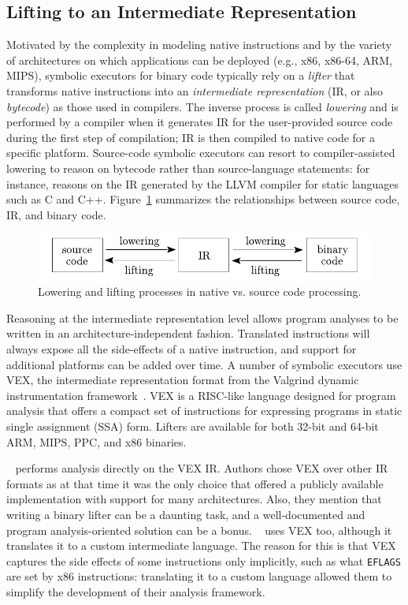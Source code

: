 \subsection{Lifting to an Intermediate Representation}
Motivated by the complexity in modeling native instructions and by the variety of architectures on which applications can be deployed (e.g., x86, x86-64, ARM, MIPS), symbolic executors for binary code typically rely on a {\em lifter} that transforms native instructions into an {\em intermediate representation} (IR, or also {\em bytecode}) as those used in compilers. The inverse process is called {\em lowering} and is performed by a compiler when it generates IR for the user-provided source code during the first step of compilation; IR is then compiled to native code for a specific platform. Source-code symbolic executors can resort to compiler-assisted lowering to reason on bytecode rather than source-language statements: for instance, \cite{KLEE-OSDI08} reasons on the IR generated by the LLVM compiler for static languages such as C and C++. Figure~\ref{fig:lowering} summarizes the relationships between source code, IR, and binary code.

\begin{figure}[t!]
  \centering
  \includegraphics[width=.6\columnwidth]{images/compiler}
  \caption{\label{fig:lowering} Lowering and lifting processes in native vs. source code processing.}
\end{figure}

Reasoning at the intermediate representation level allows program analyses to be written in an architecture-independent fashion. Translated instructions will always expose all the side-effects of a native instruction, and support for additional platforms can be added over time. A number of symbolic executors use VEX, the intermediate representation format from the Valgrind dynamic instrumentation framework~\cite{VALGRIND-PLDI07}. VEX is a RISC-like language designed for program analysis that offers a compact set of instructions for expressing programs in static single assignment (SSA) form. Lifters are available for both 32-bit and 64-bit ARM, MIPS, PPC, and x86 binaries.

~\cite{ANGR-SP16} performs analysis directly on the VEX IR. Authors chose VEX over other IR formats as at that time it was the only choice that offered a publicly available implementation with support for many architectures. Also, they mention that writing a binary lifter can be a daunting task, and a well-documented and program analysis-oriented solution can be a bonus. ~\cite{BITBLAZE-ICISS08} uses VEX too, although it translates it to a custom intermediate language. The reason for this is that VEX captures the side effects of some instructions only implicitly, such as what {\tt EFLAGS} are set by x86 instructions: translating it to a custom language allowed them to simplify the development of their analysis framework.


